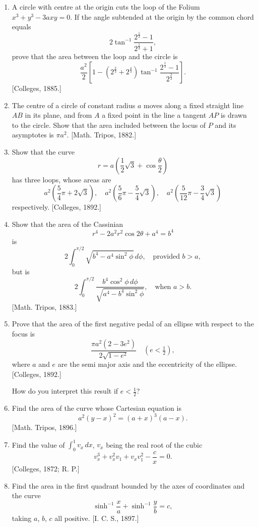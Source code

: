 \documentclass[11pt, a4paper]{article}
\newcommand{\source}[1]{\hfill\textnormal{[#1]}}
\begin{document}
\begin{enumerate}[leftmargin=2em]
\item A circle with centre at the origin cuts the loop of the Folium $x^3+y^3-3axy=0$. If the angle subtended at the origin by the common chord equals
\[
2\tan^{-1}\frac{2^{\frac13}-1}{2^{\frac13}+1},
\]
prove that the area between the loop and the circle is
\[
\frac{a^2}{2}\left[1-(2^{\frac23}+2^{\frac43})\tan^{-1}\frac{2^{\frac13}-1}{2^{\frac23}}\right].
\]
\source{Colleges, 1885.}

\item The centre of a circle of constant radius $a$ moves along a fixed straight line $AB$ in its plane, and from $A$ a fixed point in the line a tangent $AP$ is drawn to the circle. Show that the area included between the locus of $P$ and its asymptotes is $\pi a^2$. \source{Math. Tripos, 1882.}

\item Show that the curve
\[
r=a\left(\frac12\sqrt3+\cos\frac{\theta}{2}\right)
\]
has three loops, whose areas are
\[
a^2\left(\frac54\pi+2\sqrt3\right),\quad a^2\left(\frac56\pi-\frac54\sqrt3\right),\quad a^2\left(\frac{5}{12}\pi-\frac34\sqrt3\right)
\]
respectively. \source{Colleges, 1892.}

\item Show that the area of the Cassinian
\[
r^4-2a^2r^2\cos2\theta+a^4=b^4
\]
is
\[
2\int_0^{\pi/2}\sqrt{b^4-a^4\sin^2\phi}\,d\phi,\quad\text{provided } b>a,
\]
but is
\[
2\int_0^{\pi/2}\frac{b^4\cos^2\phi\,d\phi}{\sqrt{a^4-b^4\sin^2\phi}},\quad\text{when } a>b.
\]
\source{Math. Tripos, 1883.}

\item Prove that the area of the first negative pedal of an ellipse with respect to the focus is
\[
\frac{\pi a^2(2-3e^2)}{2\sqrt{1-e^2}}\quad(e<\tfrac12),
\]
where $a$ and $e$ are the semi major axis and the eccentricity of the ellipse. \source{Colleges, 1892.}

How do you interpret this result if $e<\tfrac12$?

\item Find the area of the curve whose Cartesian equation is
\[
a^2(y-x)^2=(a+x)^3(a-x).
\]
\source{Math. Tripos, 1896.}

\item Find the value of $\displaystyle\int_0^1 v_x\,dx$, $v_x$ being the real root of the cubic
\[
v_x^3+v_x^2v_1+v_xv_1^2-\frac{c}{x}=0.
\]
\source{Colleges, 1872; R. P.}

\item Find the area in the first quadrant bounded by the axes of coordinates and the curve
\[
\sinh^{-1}\frac{x}{a}+\sinh^{-1}\frac{y}{b}=c,
\]
taking $a$, $b$, $c$ all positive. \source{I. C. S., 1897.}


\end{enumerate}
\end{document}

